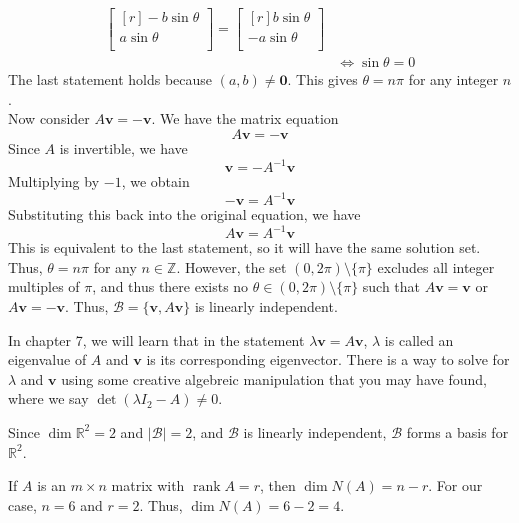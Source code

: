\documentclass[12pt, letterpaper]{article}
\DeclareMathOperator{\rank}{rank}
\begin{document}
\begin{solution}
\begin{align*}
\begin{bmatrix}[r]
         -b\sin \theta  \\
          a \sin \theta \\
      \end{bmatrix} = \begin{bmatrix}[r]
         b\sin \theta  \\
          -a \sin \theta \\
      \end{bmatrix}\\
      &\iff \sin \theta =0
    \end{align*}
    The last statement holds because \((a,b)\neq \mathbf{0}\). This gives \(\theta =n \pi \) for any integer \(n\).\\
    Now consider \(A \mathbf{v}=-\mathbf{v}\). We have the matrix equation 
    \[
        A \mathbf{v}= -\mathbf{v}
    \]
    Since \(A\) is invertible, we have
    \[
        \mathbf{v}=-A^{-1} \mathbf{v}
    \]
    Multiplying by \(-1\), we obtain
    \[
        -\mathbf{v}=A^{-1} \mathbf{v}
    \]
    Substituting this back into the original equation, we have
    \[
        A \mathbf{v}= A^{-1} \mathbf{v}
    \]
    This is equivalent to the last statement, so it will have the same solution set. Thus, \(\theta =n\pi\) for any \(n\in\mathbb{Z}\). However, the set \((0,2\pi )\setminus\{ \pi  \} \) excludes all integer multiples of \(\pi \), and thus there exists no \(\theta \in (0,2\pi )\setminus\{ \pi  \} \) such that \(A \mathbf{v} = \mathbf{v}\) or \(A \mathbf{v}=-\mathbf{v}\). Thus, \(\mathcal{B} =\{ \mathbf{v},A \mathbf{v} \} \) is linearly independent.
\end{solution}
\begin{remark}
    In chapter 7, we will learn that in the statement \(\lambda \mathbf{v}=A \mathbf{v}\), \(\lambda \) is called an eigenvalue of \(A\) and \(\mathbf{v}\) is its corresponding eigenvector. There is a way to solve for \(\lambda \) and \(\mathbf{v}\) using some creative algebreic manipulation that you may have found, where we say \(\det (\lambda I_2 - A)\neq 0\).
\end{remark}
\begin{solution}
    Since \(\dim \mathbb{R}^2 = 2\) and \(\vert \mathcal{B}  \vert =2 \), and \(\mathcal{B} \) is linearly independent, \(\mathcal{B} \) forms a basis for \(\mathbb{R}^2\).
\end{solution}
\begin{solution}
    If \(A\) is an \(m\times n\) matrix with \(\rank A=r\), then \(\dim N(A)=n-r\). For our case, \(n=6\) and \(r=2\). Thus, \(\dim N(A)=6-2=4\).
\end{solution}
\end{document}
